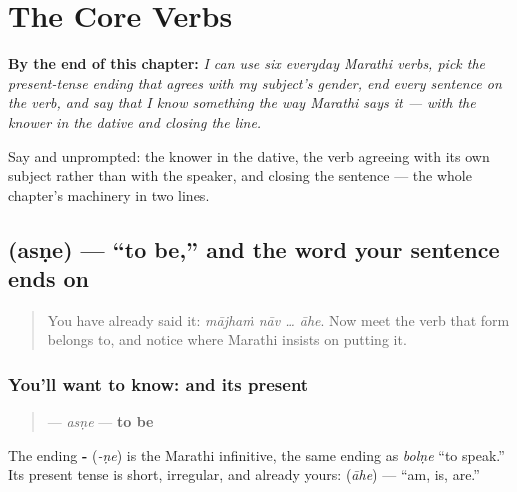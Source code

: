 
\chapter{The Core Verbs}
\label{ch:mr-core-verbs}

\begin{chapteropening}
\textbf{By the end of this chapter:} \emph{I can use six everyday Marathi verbs, pick the present-tense ending that agrees with my subject's gender, end every sentence on the verb, and say that I know something the way Marathi says it — with the knower in the dative and  closing the line.}

Say    and    unprompted: the knower in the dative, the verb agreeing with its own subject rather than with the speaker, and  closing the sentence — the whole chapter's machinery in two lines.
\end{chapteropening}

\section[\texorpdfstring{\mr{असणे} (asṇe)}{असणे (asṇe)}]{ (asṇe) — \textquotedblleft{}to be,\textquotedblright{} and the word your sentence ends on}

\label{lesson:MR-C07-asne}



\begin{quote}
You have already said it: \emph{mājhaṁ nāv … āhe}. Now meet the verb that form belongs to, and notice where Marathi insists on putting it.
\end{quote}

\subsection*{You'll want to know:  and its present }
\begin{quote}
\textbf{} — \emph{asṇe} — \textbf{to be}
\end{quote}

The ending \textbf{-} (\emph{-ṇe}) is the Marathi infinitive, the same ending as \emph{bolṇe} \textquotedblleft{}to speak.\textquotedblright{} Its present tense is short, irregular, and already yours: \textbf{} (\emph{āhe}) — \textquotedblleft{}am, is, are.\textquotedblright{}

